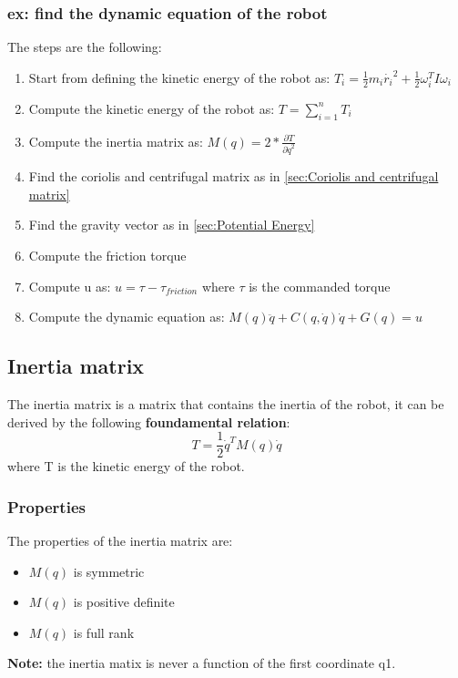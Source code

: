 \documentclass[a4paper,12pt]{article}
\begin{document}
\subsubsection{ex: find the dynamic equation of the robot}\label{sec:find the dynamic equation of the robot}
The steps are the following:
\begin{enumerate}
    \item Start from defining the kinetic energy of the robot
     as: $T_i = \frac{1}{2} m_i \dot{r_i}^2 + \frac{1}{2} \omega_i^T I \omega_i$
     \item Compute the kinetic energy of the robot as: $T = \sum_{i=1}^{n} T_i$
     \item Compute the inertia matrix as: $M(q) = 2*\frac{\partial T}{\partial \dot{q}^2}$
     \item Find the coriolis and centrifugal matrix as in \ref{sec:Coriolis and centrifugal matrix}
     \item Find the gravity vector as in \ref{sec:Potential Energy}
     \item Compute the friction torque  
     \item Compute u as: $u = \tau - \tau_{friction}$ where $\tau$ is the commanded torque
     \item Compute the dynamic equation as: $M(q) \ddot{q} + C(q, \dot{q}) \dot{q} + G(q) =u$
\end{enumerate}
\subsection{Inertia matrix} \label{sec:Inertia matrix}
The inertia matrix is a matrix that contains the inertia of the robot, it can be derived by the 
following \textbf{foundamental relation}:
\begin{equation}
    T= \frac{1}{2} \dot{q}^T M(q) \dot{q}
\end{equation}
where T is the kinetic energy of the robot. 
\subsubsection{Properties}
The properties of the inertia matrix are:
\begin{itemize}
    \item $M(q)$ is symmetric
    \item $M(q)$ is positive definite
    \item $M(q)$ is full rank
\end{itemize}
\textbf{Note:} the inertia matix is never a function of the first coordinate q1.
\end{document}
